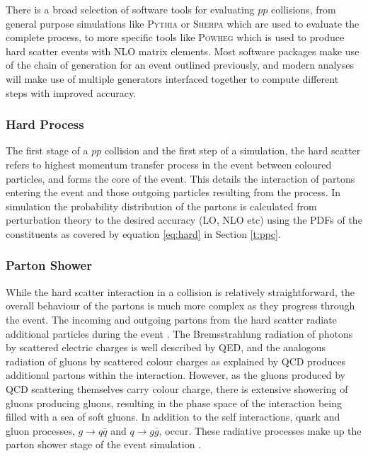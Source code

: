 	There is a broad selection of software tools for evaluating $pp$ collisions, from general purpose simulations like \textsc{Pythia}\cite{pythia} or \textsc{Sherpa}\cite{sherpa} which are used to evaluate the complete process, to more specific tools like \textsc{Powheg}\cite{powheg} which is used to produce hard scatter events with NLO matrix elements. Most software packages make use of the chain of generation for an event outlined previously, and modern analyses will make use of multiple generators interfaced together to compute different steps with improved accuracy.

		\subsubsection{Hard Process}

			The first stage of a $pp$ collision and the first step of a simulation, the hard scatter refers to highest momentum transfer process in the event between coloured particles, and forms the core of the event. This details the interaction of partons entering the event and those outgoing particles resulting from the process. In simulation the probability distribution of the partons is calculated from perturbation theory to the desired accuracy (LO, NLO etc) using the PDFs of the constituents as covered by equation \ref{eq:hard} in Section \ref{t:ppc}.

		\subsubsection{Parton Shower}

			While the hard scatter interaction in a collision is relatively straightforward, the overall behaviour of the partons is much more complex as they progress through the event. The incoming and outgoing partons from the hard scatter radiate additional  particles during the event \cite{martinshaw, monte-carlo}.
			The Bremsstrahlung  radiation of photons by scattered electric charges is well described by QED, and the analogous radiation of gluons by scattered colour charges as explained by QCD produces additional partons within the interaction. However, as the gluons produced by QCD scattering themselves carry colour charge, there is extensive showering of gluons producing gluons, resulting in the phase space of the interaction being filled with a sea of soft gluons. In addition to the self interactions, quark and gluon processes, $g\rightarrow q\bar{q}$ and $q\rightarrow g\bar{g}$, occur. These radiative processes make up the parton shower stage of the event simulation \cite{monte-carlo}.

